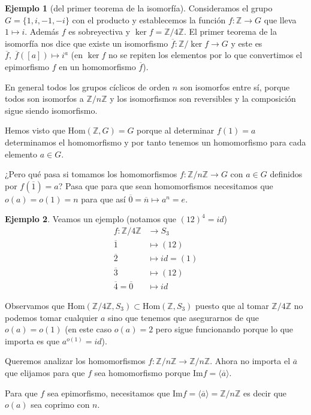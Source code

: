 \documentclass{book}
\theoremstyle{definition}
\newtheorem{ej}{Ejemplo}
\theoremstyle{remark}
\newcommand{\ima}{\text{Im}}
\newcommand{\Z}{\mathbb{Z}}
\newcommand{\ZnZ}{\mathbb{Z}/n\mathbb{Z}}
\begin{document}
\begin{ej}[del primer teorema de la isomorfía]
	Consideramos el grupo $G = \{1, i, -1, -i\}$ con el producto y establecemos la función $f:\Z \to G$ que lleva $1 \mapsto i$. Además $f$ es sobreyectiva y $\ker f = \Z/4\Z$. El primer teorema de la isomorfía nos dice que existe un isomorfismo $\overline{f}: \Z/\ker f \to G$ y este es $\overline{f},\ \overline{f}([a]) \mapsto i^{a}$ (en $\ker f$ no se repiten los elementos por lo que convertimos el epimorfismo $f$ en un homomorfismo $\overline{f}$).
\end{ej}

En general todos los grupos cíclicos de orden $n$ son isomorfos entre sí, porque todos son isomorfos a $\Z/n\Z$ y los isomorfismos son reversibles y la composición sigue siendo isomorfismo.

Hemos visto que $\text{Hom}(\Z, G) = G$ porque al determinar $f(1) = a$ determinamos el homomorfismo y por tanto tenemos un homomorfismo para cada elemento $a \in G$.

¿Pero qué pasa si tomamos los homomorfismos $f:\ZnZ \to G$ con $a \in G$ definidos por $f(\overline{1}) = a$? Pasa que para que sean homomorfismos necesitamos que $o(a) = o(1) = n$ para que así $\overline{0} = \overline{n} \mapsto a^n = e$.

\begin{ej}
	Veamos un ejemplo (notamos que $(12)^4 = id$)
	\begin{align*}
		f:\Z/4\Z &\to S_3 \\
		\overline{1} &\mapsto (12) \\
		\overline{2} &\mapsto id = (1) \\
		\overline{3} &\mapsto (12) \\
		\overline{4} = \overline{0} &\mapsto id
	\end{align*}
	
	Observamos que $\text{Hom}(\Z/4\Z, S_3) \subset \text{Hom}(\Z, S_3)$ puesto que al tomar $\Z/4\Z$ no podemos tomar cualquier $a$ sino que tenemos que asegurarnos de que $o(a) = o(1)$ (en este caso $o(a) = 2$ pero sigue funcionando porque lo que importa es que $a^{o(1)} = id$).
\end{ej}

Queremos analizar los homomorfismos $f:\ZnZ \to \ZnZ$. Ahora no importa el $\overline{a}$ que elijamos para que $f$ sea homomorfismo porque $\ima f = \langle \overline{a} \rangle$. 

Para que $f$ sea epimorfismo, necesitamos que $\ima f = \langle \overline{a} \rangle = \ZnZ$ es decir que $o(a)$ sea coprimo con $n$.
\end{document}
